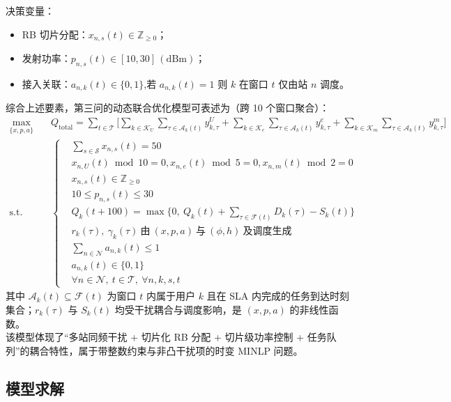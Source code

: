 决策变量：
\begin{itemize}
  \item RB 切片分配：$x_{n,s}(t)\in\mathbb{Z}_{\ge 0}$；
  \item 发射功率：$p_{n,s}(t)\in[10,30]\,\mathrm{(dBm)}$；
  \item 接入关联：$a_{n,k}(t)\in\{0,1\}$,若 $a_{n,k}(t)=1$ 则 $k$ 在窗口 $t$ 仅由站 $n$ 调度。
\end{itemize}

综合上述要素，第三问的动态联合优化模型可表述为（跨 10 个窗口聚合）：
\begin{equation}
\begin{aligned}
\max_{\{x,p,a\}}\quad & Q_{\text{total}}=\sum_{t\in\mathcal{T}}\Bigg[\sum_{k\in\mathcal{K}_U}\sum_{\tau\in\mathcal{A}_k(t)} y^{U}_{k,\tau}+\sum_{k\in\mathcal{K}_e}\sum_{\tau\in\mathcal{A}_k(t)} y^{e}_{k,\tau}+\sum_{k\in\mathcal{K}_m}\sum_{\tau\in\mathcal{A}_k(t)} y^{m}_{k,\tau}\Bigg] \\
\text{s.t.}\quad & 
\left\{
\begin{aligned}
&\sum_{s\in\mathcal{S}} x_{n,s}(t)=50 \\
&x_{n,U}(t)\bmod 10=0 ,x_{n,e}(t)\bmod 5=0 ,x_{n,m}(t)\bmod 2=0 \\
&x_{n,s}(t)\in\mathbb{Z}_{\ge 0} \\
&10\le p_{n,s}(t)\le 30\\
&Q_k(t+100)=\max\Big\{0,\ Q_k(t)+\sum_{\tau\in\mathcal{F}(t)} D_k(\tau)-S_k(t)\Big\} \\
&r_k(\tau),\ \gamma_k(\tau)\ \text{由}\ (x,p,a)\ \text{与}\ (\phi,h)\ \text{及调度生成} \\
&\sum_{n\in\mathcal{N}} a_{n,k}(t)\le 1 \\
&a_{n,k}(t)\in\{0,1\} \\
&\forall n\in\mathcal{N},\ t\in\mathcal{T},\ \forall n,k,s,t
\end{aligned}
\right.
\end{aligned}
\end{equation}
其中 $\mathcal{A}_k(t)\subseteq\mathcal{F}(t)$ 为窗口 $t$ 内属于用户 $k$ 且在 SLA 内完成的任务到达时刻集合；$r_k(\tau)$ 与 $S_k(t)$ 均受干扰耦合与调度影响，是 $(x,p,a)$ 的非线性函数。\\
该模型体现了“多站同频干扰 + 切片化 RB 分配 + 切片级功率控制 + 任务队列”的耦合特性，属于带整数约束与非凸干扰项的时变 MINLP 问题。

\subsection{模型求解}

